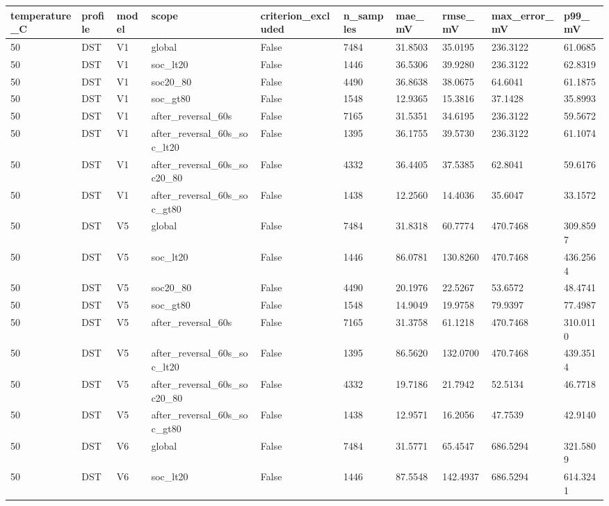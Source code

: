 \begin{tabular}{llllllllll}
\hline
temperature\_C & profile & model & scope & criterion\_excluded & n\_samples & mae\_mV & rmse\_mV & max\_error\_mV & p99\_mV \\
\hline
50 & DST & V1 & global & False & 7484 & 31.8503 & 35.0195 & 236.3122 & 61.0685 \\
50 & DST & V1 & soc\_lt20 & False & 1446 & 36.5306 & 39.9280 & 236.3122 & 62.8319 \\
50 & DST & V1 & soc20\_80 & False & 4490 & 36.8638 & 38.0675 & 64.6041 & 61.1875 \\
50 & DST & V1 & soc\_gt80 & False & 1548 & 12.9365 & 15.3816 & 37.1428 & 35.8993 \\
50 & DST & V1 & after\_reversal\_60s & False & 7165 & 31.5351 & 34.6195 & 236.3122 & 59.5672 \\
50 & DST & V1 & after\_reversal\_60s\_soc\_lt20 & False & 1395 & 36.1755 & 39.5730 & 236.3122 & 61.1074 \\
50 & DST & V1 & after\_reversal\_60s\_soc20\_80 & False & 4332 & 36.4405 & 37.5385 & 62.8041 & 59.6176 \\
50 & DST & V1 & after\_reversal\_60s\_soc\_gt80 & False & 1438 & 12.2560 & 14.4036 & 35.6047 & 33.1572 \\
50 & DST & V5 & global & False & 7484 & 31.8318 & 60.7774 & 470.7468 & 309.8597 \\
50 & DST & V5 & soc\_lt20 & False & 1446 & 86.0781 & 130.8260 & 470.7468 & 436.2564 \\
50 & DST & V5 & soc20\_80 & False & 4490 & 20.1976 & 22.5267 & 53.6572 & 48.4741 \\
50 & DST & V5 & soc\_gt80 & False & 1548 & 14.9049 & 19.9758 & 79.9397 & 77.4987 \\
50 & DST & V5 & after\_reversal\_60s & False & 7165 & 31.3758 & 61.1218 & 470.7468 & 310.0110 \\
50 & DST & V5 & after\_reversal\_60s\_soc\_lt20 & False & 1395 & 86.5620 & 132.0700 & 470.7468 & 439.3514 \\
50 & DST & V5 & after\_reversal\_60s\_soc20\_80 & False & 4332 & 19.7186 & 21.7942 & 52.5134 & 46.7718 \\
50 & DST & V5 & after\_reversal\_60s\_soc\_gt80 & False & 1438 & 12.9571 & 16.2056 & 47.7539 & 42.9140 \\
50 & DST & V6 & global & False & 7484 & 31.5771 & 65.4547 & 686.5294 & 321.5809 \\
50 & DST & V6 & soc\_lt20 & False & 1446 & 87.5548 & 142.4937 & 686.5294 & 614.3241 \\

\end{tabular}
